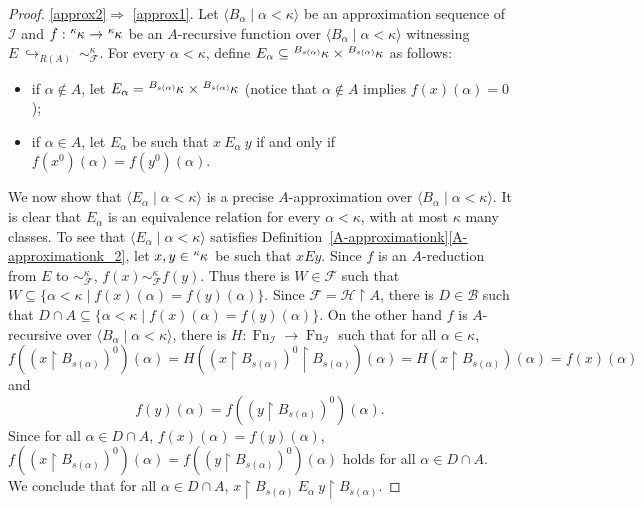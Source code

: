 \documentclass[10pt,a4paper]{amsart}
\newtheorem{claim}{Claim}
\DeclareMathOperator{\Fn}{Fn}
\newcommand{\I}{\mathcal{I}}
\renewcommand{\a}{\alpha}
\renewcommand{\k}{\kappa}
\newcommand{\pre}[2]{\tensor[^{#1}]{#2}{}}
\newcommand{\seq}[2]{\langle #1 \mid #2 \rangle}
\begin{document}
\begin{proof}
\ref{approx2}$\Rightarrow$ \ref{approx1}.
Let $\seq{B_\alpha}{\alpha<\kappa}$ be an approximation sequence of $\mathcal{I}$ and $f:\pre{\k}{\kappa}\rightarrow\pre{\k}{\kappa}$ be an $A$-recursive function over $\seq{B_\alpha}{\alpha<\kappa}$ witnessing $E\ \hookrightarrow_{R(A)}\ \sim^\kappa_\mathcal{F}$. 
    For every $\alpha<\kappa$, define $E_\alpha\subseteq \pre{B_{s(\alpha)}}{\k}\times\pre{B_{s(\alpha)}}{\k}$ as follows:
    \begin{itemize}
        \item if $\alpha\notin A$, let $E_\alpha=\pre{B_{s(\alpha)}}{\k}\times\pre{B_{s(\alpha)}}{\k}$ (notice that $\alpha\notin A$ implies $f(x)(\alpha)=0$);
        \item if $\alpha\in A$, let \(E_\a\) be such that $x\ E_\alpha\ y$ if and only if $f(x^0)(\alpha)=f(y^0)(\alpha)$.
   \end{itemize}
     We now show that $\langle E_\alpha\mid \alpha<\kappa\rangle$ is a precise $A$-approximation over $\seq{B_\alpha}{\alpha<\kappa}$.
It is clear that $E_\alpha$ is an equivalence relation for every $\alpha<\k$, with at most $\k$ many classes. To see that $\langle E_\alpha\mid \alpha<\kappa\rangle$ satisfies Definition~\ref{A-approximationk}\ref{A-approximationk_2}, let $x,y\in\pre{\k}{\kappa}$  be such that $x Ey$. Since $f$ is an $A$-reduction from $E$ to $\sim^\kappa_\mathcal{F}$, $f(x)\sim^\kappa_\mathcal{F} f(y)$. Thus there is $W\in \mathcal{F}$ such that $W\subseteq \{\alpha<\kappa\mid f(x)(\alpha)= f(y)(\alpha)\}$. 
Since $\mathcal{F}=\mathcal{H}\restriction A$, there is $D\in \mathcal{B}$ such that $D\cap A\subseteq\{\alpha<\kappa\mid f(x)(\alpha)= f(y)(\alpha)\}$.
On the other hand $f$ is $A$-recursive over $\seq{B_\alpha}{\alpha<\kappa}$, there is $H:\Fn_{\I}\rightarrow \Fn_{\I}$ such that for all $\alpha\in \kappa$, $$f((x\restriction B_{s(\alpha)})^0)(\alpha)=H((x\restriction B_{s(\alpha)})^0\restriction B_{s(\alpha)})(\alpha)=H(x\restriction B_{s(\alpha)})(\alpha)=f(x)(\alpha)$$ and $$f(y)(\alpha)=f((y\restriction B_{s(\alpha)})^0)(\alpha).$$ 
Since for all $\alpha\in D\cap A$, $f(x)(\alpha)=f(y)(\alpha)$, $f((x\restriction B_{s(\alpha)})^0)(\alpha)=f((y\restriction B_{s(\alpha)})^0)(\alpha)$ holds for all $\alpha\in D\cap A$. We conclude that for all $\alpha\in D\cap A$, $x\restriction B_{s(\alpha)}\ E_\alpha\ y\restriction B_{s(\alpha)}$. 


\end{proof}
\end{document}
